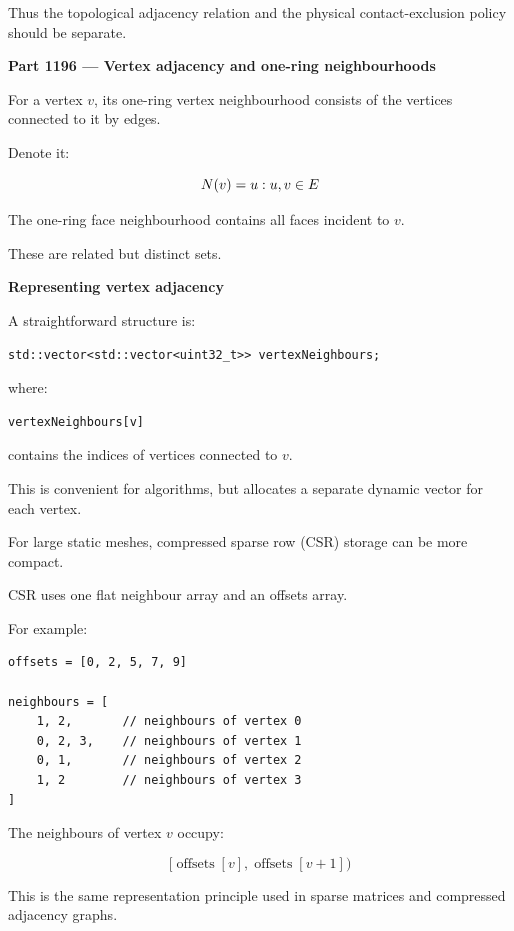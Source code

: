 Thus the topological adjacency relation and the physical contact-exclusion policy should be separate.

\textbf{Part 1196 --- Vertex adjacency and one-ring neighbourhoods}

For a vertex \(v\), its one-ring vertex neighbourhood consists of the vertices connected to it by edges.

Denote it:

\[
N(v)=\\{u:\\{u,v\\}\in E\\}
\]

The one-ring face neighbourhood contains all faces incident to \(v\).

These are related but distinct sets.

\textbf{Representing vertex adjacency}

A straightforward structure is:

\begin{verbatim}
std::vector<std::vector<uint32_t>> vertexNeighbours;
\end{verbatim}

where:

\begin{verbatim}
vertexNeighbours[v]
\end{verbatim}

contains the indices of vertices connected to \(v\).

This is convenient for algorithms, but allocates a separate dynamic vector for each vertex.

For large static meshes, compressed sparse row (CSR) storage can be more compact.

CSR uses one flat neighbour array and an offsets array.

For example:

\begin{verbatim}
offsets = [0, 2, 5, 7, 9]

neighbours = [
    1, 2,       // neighbours of vertex 0
    0, 2, 3,    // neighbours of vertex 1
    0, 1,       // neighbours of vertex 2
    1, 2        // neighbours of vertex 3
]
\end{verbatim}

The neighbours of vertex \(v\) occupy:

\[
[\operatorname{offsets}[v], \operatorname{offsets}[v+1])
\]

This is the same representation principle used in sparse matrices and compressed adjacency graphs.

